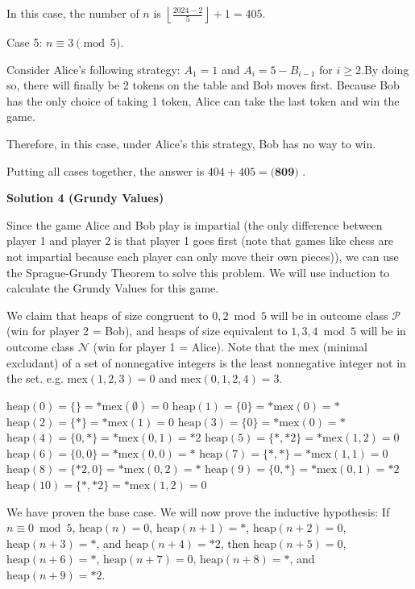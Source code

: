 \begin{enumerate}
 In this case, the number of $n$ is $\left\lfloor \frac{2024 - 2}{5} \right\rfloor +1 = 405$.

 Case 5: $n \equiv 3 \pmod{5}$.

 Consider Alice's following strategy: $A_1 = 1$ and $A_i = 5 - B_{i-1}$ for $i \geq 2$.By doing so, there will finally be 2 tokens on the table and Bob moves first. Because Bob has the only choice of taking 1 token, Alice can take the last token and win the game.

 Therefore, in this case, under Alice's this strategy, Bob has no way to win.

 Putting all cases together, the answer is $404 + 405 = \boxed{\textbf{(809) }}$.

 


 



\textbf{Solution 4 (Grundy Values)}

Since the game Alice and Bob play is impartial (the only difference between player 1 and player 2 is that player 1 goes first (note that games like chess are not impartial because each player can only move their own pieces)), we can use the Sprague-Grundy Theorem to solve this problem. We will use induction to calculate the Grundy Values for this game.

 We claim that heaps of size congruent to $0,2 \bmod{5}$ will be in outcome class $\mathcal{P}$ (win for player 2 = Bob), and heaps of size equivalent to $1,3,4 \bmod{5}$ will be in outcome class $\mathcal{N}$ (win for player 1 = Alice). Note that the mex (minimal excludant) of a set of nonnegative integers is the least nonnegative integer not in the set. e.g. mex$(1, 2, 3) = 0$ and mex$(0, 1, 2, 4) = 3$.

 
$\text{heap}(0) = \{\} = *\text{mex}(\emptyset) = 0$
$\text{heap}(1) = \{0\} = *\text{mex}(0) = *$
$\text{heap}(2) = \{*\} = *\text{mex}(1) = 0$
$\text{heap}(3) = \{0\} = *\text{mex}(0) = *$
$\text{heap}(4) = \{0, *\} = *\text{mex}(0, 1) = *2$
$\text{heap}(5) = \{*, *2\} = *\text{mex}(1, 2) = 0$
$\text{heap}(6) = \{0, 0\} = *\text{mex}(0, 0) = *$
$\text{heap}(7) = \{*, *\} = *\text{mex}(1, 1) = 0$
$\text{heap}(8) = \{*2, 0\} = *\text{mex}(0, 2) = *$
$\text{heap}(9) = \{0, *\} = *\text{mex}(0, 1) = *2$
$\text{heap}(10) = \{*, *2\} = *\text{mex}(1, 2) = 0$

 
We have proven the base case. We will now prove the inductive hypothesis: If $n \equiv 0 \bmod{5}$, $\text{heap}(n) = 0$, $\text{heap}(n+1) = *$, $\text{heap}(n+2) = 0$, $\text{heap}(n+3) = *$, and $\text{heap}(n+4) = *2$, then $\text{heap}(n+5) = 0$, $\text{heap}(n+6) = *$, $\text{heap}(n+7) = 0$, $\text{heap}(n+8) = *$, and $\text{heap}(n+9) = *2$.


\end{enumerate}
